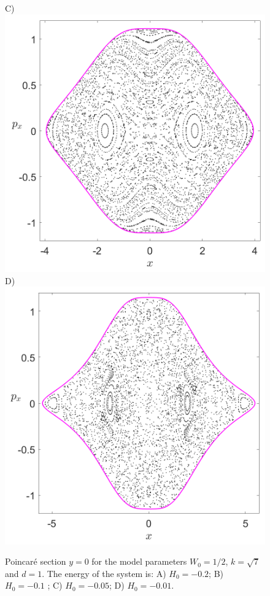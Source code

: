 \documentclass[10pt,aps,onecolumn,superscriptaddress]{revtex4-2}
\begin{document}
\begin{figure}[htbp]
	C)\includegraphics[scale=0.3]{PS_cirque_H_-0_05_y_0_w0_1div2_d_1_k_sqrt7.png}
	D)\includegraphics[scale=0.3]{PS_cirque_H_-0_01_y_0_w0_1div2_d_1_k_sqrt7.png}
	\caption{Poincar\'e section $y = 0$ for the model parameters $W_0 = 1/2$, $k = \sqrt{7}$ and $d = 1$. The energy of the system is: A) $H_0 = -0.2$; B) $H_0 = -0.1$ ; C) $H_0 = -0.05$; D) $H_0 = -0.01$.}
	\label{fig:psec_y_0_bif}
\end{figure}
\end{document}
